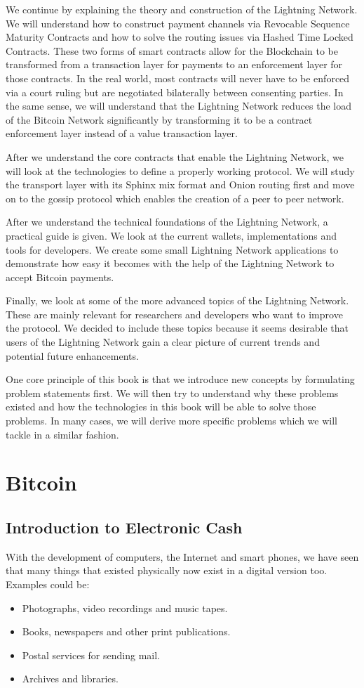 \documentclass[a4paper,12pt,oneside,openany]{book}
\begin{document}
We continue by explaining the theory and construction of the Lightning
Network.  We will understand how to construct payment channels via
Revocable Sequence Maturity Contracts and how to solve the routing
issues via Hashed Time Locked Contracts.  These two forms of smart
contracts allow for the Blockchain to be transformed from a transaction
layer for payments to an enforcement layer for those contracts.  In the
real world, most contracts will never have to be enforced via a court
ruling but are negotiated bilaterally between consenting parties.  In
the same sense, we will understand that the Lightning Network reduces
the load of the Bitcoin Network significantly by transforming it to be a
contract enforcement layer instead of a value transaction layer.

After we understand the core contracts that enable the Lightning
Network, we will look at the technologies to define a properly working
protocol.  We will study the transport layer with its Sphinx mix format
and Onion routing first and move on to the gossip protocol which enables
the creation of a peer to peer network.

After we understand the technical foundations of the Lightning Network,
a practical guide is given.  We look at the current wallets,
implementations and tools for developers.  We create some small
Lightning Network applications to demonstrate how easy it becomes with
the help of the Lightning Network to accept Bitcoin payments.

Finally, we look at some of the more advanced topics of the Lightning
Network.  These are mainly relevant for researchers and developers who
want to improve the protocol.  We decided to include these topics
because it seems desirable that users of the Lightning Network gain a
clear picture of current trends and potential future enhancements.

One core principle of this book is that we introduce new concepts by
formulating problem statements first. We will then try to understand why
these problems existed and how the technologies in this book will be
able to solve those problems. In many cases, we will derive more
specific problems which we will tackle in a similar fashion.

\chapter{Bitcoin}
\section{Introduction to Electronic Cash}
  With the
development of computers, the Internet and smart phones, we have seen
that many things that existed physically now exist in a digital version
too.  Examples could be:
\begin{itemize}
\item Photographs, video recordings and music tapes.
\item Books, newspapers and other print publications.
\item Postal services for sending mail.
\item Archives and libraries.
\end{itemize}
\end{document}
